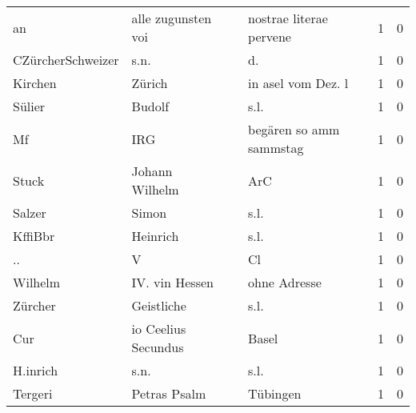 \begin{tabular}{llllrr}
                       an &                 alle zugunsten voi &             &                     nostrae literae pervene &          1 &         0 \\
        CZürcherSchweizer &                               s.n. &             &                                         d.  &          1 &         0 \\
                  Kirchen &                             Zürich &             &                          in asel vom Dez. l &          1 &         0 \\
                   Sülier &                             Budolf &             &                                        s.l. &          1 &         0 \\
                       Mf &                                IRG &             &                     begären so amm sammstag &          1 &         0 \\
                    Stuck &                     Johann Wilhelm &             &                                         ArC &          1 &         0 \\
                   Salzer &                              Simon &             &                                        s.l. &          1 &         0 \\
                  KffiBbr &                           Heinrich &             &                                        s.l. &          1 &         0 \\
                       .. &                                  V &             &                                          Cl &          1 &         0 \\
                  Wilhelm &                     IV. vin Hessen &             &                                ohne Adresse &          1 &         0 \\
                  Zürcher &                         Geistliche &             &                                        s.l. &          1 &         0 \\
                      Cur &                io Ceelius Secundus &             &                                       Basel &          1 &         0 \\
                 H.inrich &                               s.n. &             &                                        s.l. &          1 &         0 \\
                  Tergeri &                       Petras Psalm &             &                                    Tübingen &          1 &         0 \\

\end{tabular}
